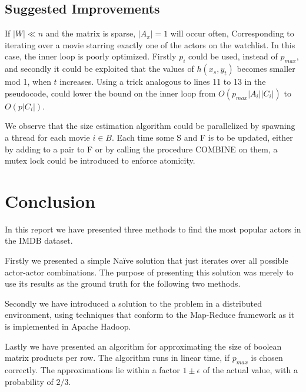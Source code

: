 \documentclass[a4paper,11pt]{article}
\begin{document}



\subsection{Suggested Improvements}
If $|W|\ll n$ and the matrix is sparse, $|A_{\pi}|=1$ will occur often, Corresponding to iterating over a movie starring exactly one of the actors on the watchlist. In this case, the inner loop is poorly optimized. Firstly $p_i$ could be used, instead of $p_{max}$, and secondly it could be exploited that the values of $h(x_s, y_t)$ becomes smaller mod 1, when $t$ increases. Using a trick analogous to lines 11 to 13 in the pseudocode, could lower the bound on the inner loop from $O(p_{max}|A_i||C_i|)$ to $O(p|C_i|)$.

We observe that the size estimation algorithm could be parallelized by spawning a thread for each movie  $i \in B$. Each time some S and F is to be updated, either by adding to a pair to F or by calling the procedure COMBINE on them, a mutex lock could be introduced to enforce atomicity. 


\section{Conclusion}
In this report we have presented three methods to find the most popular actors in the IMDB dataset.


Firstly we presented a simple Naïve solution that just iterates over all possible actor-actor combinations. The purpose of presenting this solution was merely to use its results as the ground truth for the following two methods.


Secondly we have introduced a solution to the problem in a distributed environment, using techniques that conform to the Map-Reduce framework as it is implemented in Apache Hadoop.


Lastly we have presented an algorithm for approximating the size of boolean matrix products per row. The algorithm runs in linear time, if $p_{max}$ is chosen correctly. The approximations lie within a factor $1\pm\epsilon$ of the actual value, with a probability of $2/3$.
 
\end{document}
